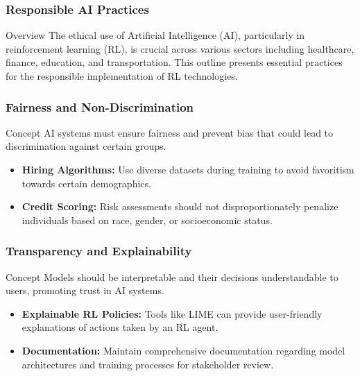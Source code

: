 \documentclass[aspectratio=169]{beamer}
\begin{document}
\begin{frame}[fragile]
    \frametitle{Responsible AI Practices}
    \begin{block}{Overview}
        The ethical use of Artificial Intelligence (AI), particularly in reinforcement learning (RL), is crucial across various sectors including healthcare, finance, education, and transportation. 
        This outline presents essential practices for the responsible implementation of RL technologies.
    \end{block}
\end{frame}

\begin{frame}[fragile]
    \frametitle{Fairness and Non-Discrimination}
    \begin{block}{Concept}
        AI systems must ensure fairness and prevent bias that could lead to discrimination against certain groups.
    \end{block}
    \begin{itemize}
        \item \textbf{Hiring Algorithms:} Use diverse datasets during training to avoid favoritism towards certain demographics.
        \item \textbf{Credit Scoring:} Risk assessments should not disproportionately penalize individuals based on race, gender, or socioeconomic status.
    \end{itemize}
\end{frame}

\begin{frame}[fragile]
    \frametitle{Transparency and Explainability}
    \begin{block}{Concept}
        Models should be interpretable and their decisions understandable to users, promoting trust in AI systems.
    \end{block}
    \begin{itemize}
        \item \textbf{Explainable RL Policies:} Tools like LIME can provide user-friendly explanations of actions taken by an RL agent.
        \item \textbf{Documentation:} Maintain comprehensive documentation regarding model architectures and training processes for stakeholder review.
    \end{itemize}
\end{frame}
\end{document}
